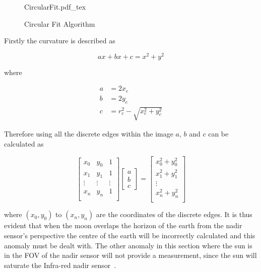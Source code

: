 \begin{figure}[!hbt]
	\centering
	\def\svgwidth{14cm}
	{CircularFit.pdf_tex}
	\caption{Circular Fit Algorithm}
	\label{fig:CircularFit}
\end{figure}

Firstly the curvature is described as 

\begin{equation}
	ax + bx + c = x^2 + y^2
\end{equation}

where 

\begin{equation}
	\begin{aligned}
		a &= 2x_c \\
		b &= 2y_c \\
		c &= r_c^2-\sqrt{x_c^2 + y_c^2}
	\end{aligned}
\end{equation}

Therefore using all the discrete edges within the image $a$, $b$ and $c$ can be calculated as

\begin{equation}
	\begin{bmatrix}
		x_0 & y_0 & 1\\
		x_1 & y_1 & 1\\
		\vdots & \vdots & \vdots\\
		x_n & y_n & 1\\
	\end{bmatrix}	\begin{bmatrix}
	a\\
	b\\
	c
\end{bmatrix} = \begin{bmatrix}
		x_0^2 + y_0^2\\
		x_1^2 + y_1^2\\
		\vdots \\
		x_n^2 + y_n^2\\
	\end{bmatrix}
\end{equation}

where $(x_0,y_0)$ to $(x_n, y_n)$ are the coordinates of the discrete edges. It is thus evident that when the moon overlaps the horizon of the earth from the nadir sensor's perspective the centre of the earth will be incorrectly calculated and this anomaly must be dealt with. The other anomaly in this section where the sun is in the FOV of the nadir sensor will not provide a measurement, since the sun will saturate the Infra-red nadir sensor~\cite{Wessels2018}.

